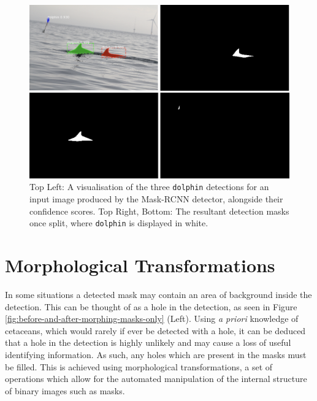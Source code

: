 \begin{figure}[h]
	\begin{center}
		\includegraphics[scale=0.5]{Chapter4/figs/190730-001-MOLS0360_-detections.png}
	\end{center}
	\caption{Top Left: A visualisation of the three \texttt{dolphin} detections for an input image produced by the Mask-RCNN detector, alongside their confidence scores. Top Right, Bottom: The resultant detection masks once split, where \texttt{dolphin} is displayed in white.}
	\label{fig:190730-001-MOLS0360_-detections}
\end{figure}


\section{Morphological Transformations}\label{ch:postProcessing,sec:morphologicalTransformations}

In some situations a detected mask may contain an area of background inside the detection. This can be thought of as a hole in the detection, as seen in Figure \ref{fig:before-and-after-morphing-masks-only} (Left). Using \textit{a priori} knowledge of cetaceans, which would rarely if ever be detected with a hole, it can be deduced that a hole in the detection is highly unlikely and may cause a loss of useful identifying information. As such, any holes which are present in the masks must be filled. This is achieved using morphological transformations, a set of operations which allow for the automated manipulation of the internal structure of binary images such as masks. 

